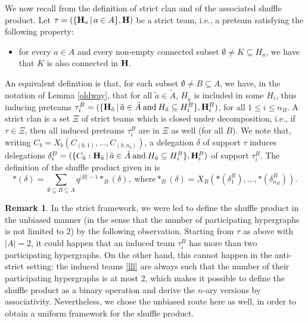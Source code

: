 \documentclass{article}
\theoremstyle{plain}
\newcommand{\incs}{\subsetneq}
\theoremstyle{definition}
\newtheorem{remark}[thm]{Remark}
\newcommand{\inc}{\subseteq}
\newcommand{\hyper}[1]{{\bf #1}}
\begin{document}
We now recall from \cite{PLBJ1} the definition of strict clan and of the associated shuffle product.  Let $\tau= (\{{\bf H}_a\,|\, a\in A\},{\bf H})$ be a strict team, i.e.,  a preteam satisfying the following property:
\begin{itemize}
\item[(S)]  for every $a\in A$ and every non-empty connected subset $\emptyset\neq K\inc H_a$, we have that $K$  is also connected in $\hyper{H}$.  
\end{itemize}
An equivalent definition  is that, for each   subset $\emptyset\neq B\subseteq A$, we have,
in the notation of Lemma \ref{oldway}, that for all $\tilde{a}\in \tilde{A}$, $H_{\tilde{a}}$  is included in some $H_i$, thus inducing preteams 
$\tau_i^B=(\{{\bf H}_{\tilde{a}}\,|\, \tilde{a}\in \tilde{A} \:\mathrm{and} \: H_{\tilde{a}}\inc H_i^B\},{\bf H}_i^B) $, 
for all $1\leq i\leq n_B$. 
A strict clan is a set $\Xi$ of strict teams which is closed under decomposition, i.e.,  if  $\tau\in\Xi$, then all induced preteams $\tau_i^B$ are in $\Xi$ as well (for all $B$).
We note that, writing $C_b=X_b(C_{(b,1)},\ldots,C_{(b,n_b)})$, 
a delegation $\delta$ of support $\tau$  induces delegations
$\delta_i^B=(\{C_{\tilde{a}}:{\bf H}_{\tilde{a}}\,|\, \tilde{a}\in \tilde{A} \:\mathrm{and} \: H_{\tilde{a}}\inc H_i^B\},{\bf H}_i^B) $ of support $\tau_i^B$. The definition of the shuffle product given in \cite{PLBJ1} is 
\begin{equation} \label{shuffle-strict-def}
\ast(\delta)= \sum_{\emptyset\incs B\subseteq A} q^{{|B|}-1}\ast_B(\delta), \;\mathrm{where}
\ast_B(\delta)=X_B(\ast(\delta_1^B),\ldots,\ast(\delta_{n_B}^B)).
\end{equation}


\begin{remark}
In the strict framework, we were led to define the shuffle product in the unbiased manner (in the sense that the number of participating hypergraphs is not limited to 2) by the following observation.  Starting from $\tau$ as above with $|A|=2$, it could happen that an induced team $\tau_i^B$ has more than two participating hypergraphs. On the other hand, this cannot happen in the anti-strict setting: the induced teams \eqref{lll} are always such that the number of their participating hypergraphs is at most 2, which makes it possible to define the shuffle product as a binary operation and derive the $n$-ary versions by associativity. Nevertheless, we chose the unbiased route here as well, in order to obtain a uniform framework for the shuffle product.
\end{remark}
\end{document}
